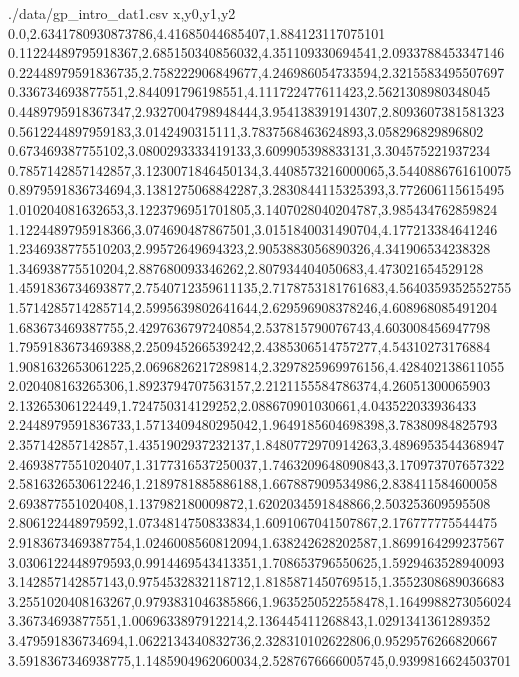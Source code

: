 \begin{filecontents*}{./data/gp_intro_dat1.csv}
    x,y0,y1,y2
    0.0,2.6341780930873786,4.41685044685407,1.884123117075101
    0.11224489795918367,2.685150340856032,4.351109330694541,2.0933788453347146
    0.22448979591836735,2.758222906849677,4.246986054733594,2.3215583495507697
    0.336734693877551,2.844091796198551,4.111722477611423,2.5621308980348045
    0.4489795918367347,2.9327004798948444,3.954138391914307,2.8093607381581323
    0.5612244897959183,3.0142490315111,3.7837568463624893,3.058296829896802
    0.673469387755102,3.0800293333419133,3.609905398833131,3.304575221937234
    0.7857142857142857,3.1230071846450134,3.4408573216000065,3.5440886761610075
    0.8979591836734694,3.1381275068842287,3.2830844115325393,3.772606115615495
    1.010204081632653,3.1223796951701805,3.1407028040204787,3.985434762859824
    1.1224489795918366,3.074690487867501,3.0151840031490704,4.177213384641246
    1.2346938775510203,2.99572649694323,2.9053883056890326,4.341906534238328
    1.346938775510204,2.887680093346262,2.807934404050683,4.473021654529128
    1.4591836734693877,2.7540712359611135,2.7178753181761683,4.5640359352552755
    1.5714285714285714,2.5995639802641644,2.629596908378246,4.608968085491204
    1.683673469387755,2.4297636797240854,2.537815790076743,4.603008456947798
    1.7959183673469388,2.250945266539242,2.4385306514757277,4.54310273176884
    1.9081632653061225,2.0696826217289814,2.3297825969976156,4.428402138611055
    2.020408163265306,1.8923794707563157,2.2121155584786374,4.26051300065903
    2.13265306122449,1.724750314129252,2.088670901030661,4.043522033936433
    2.2448979591836733,1.5713409480295042,1.9649185604698398,3.78380984825793
    2.357142857142857,1.4351902937232137,1.8480772970914263,3.4896953544368947
    2.4693877551020407,1.3177316537250037,1.7463209648090843,3.170973707657322
    2.5816326530612246,1.2189781885886188,1.667887909534986,2.838411584600058
    2.693877551020408,1.137982180009872,1.6202034591848866,2.503253609595508
    2.806122448979592,1.0734814750833834,1.6091067041507867,2.176777775544475
    2.9183673469387754,1.0246008560812094,1.638242628202587,1.8699164299237567
    3.0306122448979593,0.9914469543413351,1.708653796550625,1.5929463528940093
    3.142857142857143,0.9754532832118712,1.8185871450769515,1.3552308689036683
    3.2551020408163267,0.9793831046385866,1.9635250522558478,1.1649988273056024
    3.36734693877551,1.0069633897912214,2.136445411268843,1.0291341361289352
    3.479591836734694,1.0622134340832736,2.328310102622806,0.9529576266820667
    3.5918367346938775,1.1485904962060034,2.5287676666005745,0.9399816624503701

\end{filecontents*}
